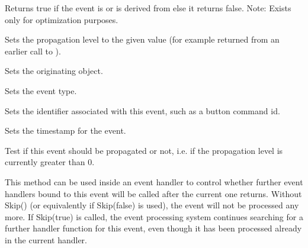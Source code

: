 \label{wxeventiscommandevent}


Returns true if the event is or is derived from
 else it returns false.
Note: Exists only for optimization purposes.


\label{wxeventresumepropagation}


Sets the propagation level to the given value (for example returned from an
earlier call to ).


\label{wxeventseteventobject}


Sets the originating object.


\label{wxeventseteventtype}


Sets the event type.


\label{wxeventsetid}


Sets the identifier associated with this event, such as a button command id.


\label{wxeventsettimestamp}


Sets the timestamp for the event.


\label{wxeventshouldpropagate}


Test if this event should be propagated or not, i.e. if the propagation level
is currently greater than $0$.


\label{wxeventskip}


This method can be used inside an event handler to control whether further
event handlers bound to this event will be called after the current one
returns. Without Skip() (or equivalently if Skip(false) is used),
the event will not be processed any more. If Skip(true) is called, the event
processing system continues searching for a further handler function for this
event, even though it has been processed already in the current handler.


